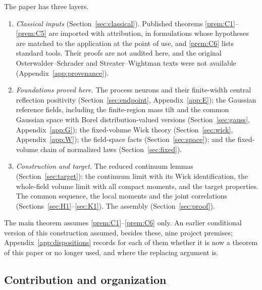 \documentclass[11pt]{article}
\theoremstyle{plain}
\theoremstyle{definition}
\theoremstyle{remark}
\begin{document}
The paper has three layers.
\begin{enumerate}[label=(\roman*)]
\item \emph{Classical inputs} (Section~\ref{sec:classical}). Published theorems
  \ref{prem:C1}--\ref{prem:C5} are imported with attribution, in formulations
  whose hypotheses are matched to the application at the point of use, and
  \ref{prem:C6} lists standard tools. Their proofs are not audited here, and
  the original Osterwalder--Schrader and Streater--Wightman texts were not
  available (Appendix~\ref{app:provenance}).
\item \emph{Foundations proved here.} The process neurons and their
  finite-width central reflection positivity (Section~\ref{sec:endpoint},
  Appendix~\ref{app:E}); the Gaussian reference fields, including the
  finite-region mass tilt and the common Gaussian space with Borel
  distribution-valued versions (Section~\ref{sec:gauss}, Appendix~\ref{app:G});
  the fixed-volume Wick theory (Section~\ref{sec:wick}, Appendix~\ref{app:W});
  the field-space facts (Section~\ref{sec:space}); and the fixed-volume
  chain of normalized laws (Section~\ref{sec:fixed}).
\item \emph{Construction and target.} The reduced continuum lemmas
  (Section~\ref{sec:target}): the continuum limit with its Wick identification,
  the whole-field volume limit with all compact moments, and the target
  properties. The common sequence, the local moments and the joint
  correlations (Sections~\ref{sec:H1}--\ref{sec:K1}). The assembly
  (Section~\ref{sec:proof}).
\end{enumerate}
The main theorem assumes \ref{prem:C1}--\ref{prem:C6} only. An earlier
conditional version of this construction assumed, besides these, nine project
premises; Appendix~\ref{app:dispositions} records for each of them whether it is
now a theorem of this paper or no longer used, and where the replacing
argument is.

\subsection{Contribution and organization}\label{sec:intro-contrib}
\end{document}
